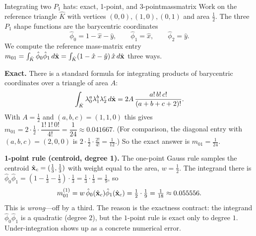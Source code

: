 \begin{workedexample}{Integrating two $P_1$ hats: exact, 1-point, and 3-point}{massmatrix}
Work on the reference triangle $\hat K$ with vertices $(0,0),(1,0),(0,1)$ and area
$\tfrac12$. The three $P_1$ shape functions are the barycentric coordinates
\[
  \hat\phi_0 = 1-\hat x-\hat y, \qquad \hat\phi_1 = \hat x, \qquad \hat\phi_2 = \hat y .
\]
We compute the reference mass-matrix entry
$m_{01} = \int_{\hat K}\hat\phi_0\hat\phi_1\,d\hat{\mathbf{x}}
        = \int_{\hat K}(1-\hat x-\hat y)\,\hat x\,d\hat{\mathbf{x}}$
three ways.

\smallskip\noindent\textbf{Exact.} There is a standard formula for integrating
products of barycentric coordinates over a triangle of area $A$:
\[
  \int_{\hat K}\lambda_0^{a}\lambda_1^{b}\lambda_2^{c}\,d\hat{\mathbf{x}}
  = 2A\,\frac{a!\,b!\,c!}{(a+b+c+2)!}.
\]
With $A=\tfrac12$ and $(a,b,c)=(1,1,0)$ this gives
$m_{01} = 2\cdot\tfrac12\cdot\dfrac{1!\,1!\,0!}{4!} = \dfrac{1}{24}\approx 0.041667$.
(For comparison, the diagonal entry with $(a,b,c)=(2,0,0)$ is
$2\cdot\tfrac12\cdot\tfrac{2!}{4!}=\tfrac{1}{12}$.) So the exact answer is
$m_{01} = \tfrac{1}{24}$.

\smallskip\noindent\textbf{1-point rule (centroid, degree 1).} The one-point Gauss
rule samples the centroid $\hat{\mathbf{x}}_c=(\tfrac13,\tfrac13)$ with weight equal to the
area, $w=\tfrac12$. The integrand there is
$\hat\phi_0\hat\phi_1 = (1-\tfrac13-\tfrac13)\cdot\tfrac13 = \tfrac13\cdot\tfrac13 = \tfrac19$,
so
\[
  m_{01}^{(1)} = w\,\hat\phi_0(\hat{\mathbf{x}}_c)\hat\phi_1(\hat{\mathbf{x}}_c)
              = \tfrac12\cdot\tfrac19 = \tfrac{1}{18} \approx 0.055556 .
\]
This is \emph{wrong}---off by a third. The reason is the exactness contract: the
integrand $\hat\phi_0\hat\phi_1$ is a quadratic (degree $2$), but the $1$-point rule
is exact only to degree $1$. Under-integration shows up as a concrete numerical error.


\end{workedexample}
